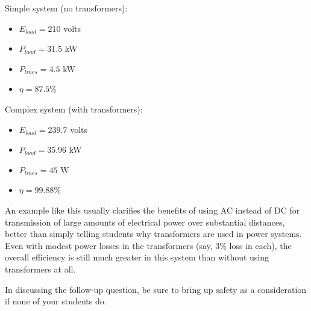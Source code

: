 





Simple system (no transformers):

\begin{itemize}
\item {} $E_{load} = 210$ volts
\item {} $P_{load} = 31.5$ kW
\item {} $P_{lines} = 4.5$ kW
\item {} $\eta = 87.5 \%$ 
\end{itemize}
\bigskip

Complex system (with transformers):

\begin{itemize}
\item {} $E_{load} = 239.7$ volts
\item {} $P_{load} = 35.96$ kW
\item {} $P_{lines} = 45$ W
\item {} $\eta = 99.88 \%$ 
\end{itemize}







An example like this usually clarifies the benefits of using AC instead of DC for transmission of large amounts of electrical power over substantial distances, better than simply telling students why transformers are used in power systems.  Even with modest power losses in the transformers (say, 3\% loss in each), the overall efficiency is still much greater in this system than without using transformers at all.

In discussing the follow-up question, be sure to bring up safety as a consideration if none of your students do.




